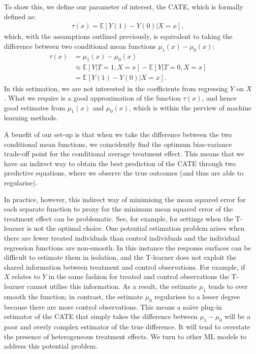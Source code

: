 \documentclass[12pt, a4paper]{article}
\begin{document}
To show this, we define our parameter of interest, the CATE, which is formally defined as:
\begin{align}
\tau (x) = \mathbb{E}[Y(1) - Y(0) | X{=}x],
\end{align}
which, with the assumptions outlined previously, is equivalent to taking the
difference between two conditional mean functions $\mu _1(x) - \mu _0(x)$:
\begin{align}
\tau (x) & = \mu _1(x) - \mu _0(x) \nonumber \\
  & \approx \mathbb{E}[Y | T {=} 1, X {=} x] - \mathbb{E}[Y | T {=} 0, X {=} x] \nonumber \\
& = \mathbb{E}[Y(1) - Y(0) | X {=} x]. \label{eq:indTE}
\end{align}
In this estimation, we are not interested in the coefficients from regressing
$Y$ on $X$. What we require is a good approximation of the function $\tau(x)$,
and hence good estimates from $\mu_1(x)$ and $\mu_0(x)$, which is within the
perview of machine learning methods.

A benefit of our set-up is that when we take the difference between the two conditional mean functions, we coincidently find the optimum bias-variance trade-off point for the conditional average treatment effect. This means that we have an indirect way to obtain the best prediction of the CATE through two predictive equations, where we observe the true outcomes (and thus are able to regularise).

In practice, however, this indirect way of minimising the mean squared error
for each separate function to proxy for the minimum mean squared error of the
treatment effect can be problematic. See, for example,
\cite{kunzel2019,kennedy2020} for settings when the T-learner is not the
optimal choice. One potential estimation problem arises when there are fewer
treated individuals than control individuals and the individual regression
functions are non-smooth. In this instance the response surfaces can be
difficult to estimate them in isolation, and the T-learner does not exploit the
shared information between treatment and control observations. For example, if
$X$ relates to $Y$ in the same fashion for treated and control observations the
T-learner cannot utilise this information. As a result, the estimate $\mu_1$
tends to over smooth the function; in contrast, the estimate $\mu_0$
regularises to a lesser degree because there are more control observations.
This means a na\"ive plug-in estimator of the CATE that simply takes the
difference between $\mu_1 - \mu_0$ will be a poor and overly complex estimator
of the true difference. It will tend to overstate the presence of heterogeneous
treatment effects. We turn to other ML models to address this potential
problem.
\end{document}

